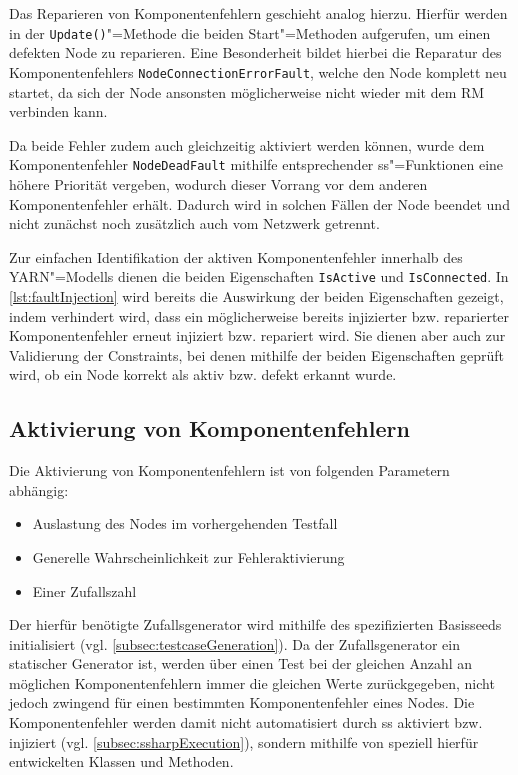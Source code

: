 Das Reparieren von Komponentenfehlern geschieht analog hierzu.
Hierfür werden in der \texttt{Update()}"=Methode die beiden Start"=Methoden aufgerufen, um einen defekten Node zu reparieren.
Eine Besonderheit bildet hierbei die Reparatur des Komponentenfehlers \texttt{NodeConnectionErrorFault}, welche den Node komplett neu startet, da sich der Node ansonsten möglicherweise nicht wieder mit dem \gls{RM} verbinden kann.

Da beide Fehler zudem auch gleichzeitig aktiviert werden können, wurde dem Komponentenfehler \texttt{NodeDeadFault} mithilfe entsprechender \gls{ss}"=Funktionen eine höhere Priorität vergeben, wodurch dieser Vorrang vor dem anderen Komponentenfehler erhält.
Dadurch wird in solchen Fällen der Node beendet und nicht zunächst noch zusätzlich auch vom Netzwerk getrennt.

Zur einfachen Identifikation der aktiven Komponentenfehler innerhalb des YARN"=Modells dienen die beiden Eigenschaften \texttt{IsActive} und \texttt{IsConnected}.
In \cref{lst:faultInjection} wird bereits die Auswirkung der beiden Eigenschaften gezeigt, indem verhindert wird, dass ein möglicherweise bereits injizierter bzw. reparierter Komponentenfehler erneut injiziert bzw. repariert wird.
Sie dienen aber auch zur Validierung der Constraints, bei denen mithilfe der beiden Eigenschaften geprüft wird, ob ein Node korrekt als aktiv bzw. defekt erkannt wurde.

\subsection{Aktivierung von Komponentenfehlern}
\label{subsec:faultActivation}

Die Aktivierung von Komponentenfehlern ist von folgenden Parametern abhängig:

\begin{itemize}
    \item Auslastung des Nodes im vorhergehenden Testfall
    \item Generelle Wahrscheinlichkeit zur Fehleraktivierung
    \item Einer Zufallszahl
\end{itemize}

Der hierfür benötigte Zufallsgenerator wird mithilfe des spezifizierten Basisseeds initialisiert (vgl. \cref{subsec:testcaseGeneration}).
Da der Zufallsgenerator ein statischer Generator ist, werden über einen Test bei der gleichen Anzahl an möglichen Komponentenfehlern immer die gleichen Werte zurückgegeben, nicht jedoch zwingend für einen bestimmten Komponentenfehler eines Nodes.
Die Komponentenfehler werden damit nicht automatisiert durch \gls{ss} aktiviert bzw. injiziert (vgl. \cref{subsec:ssharpExecution}), sondern mithilfe von speziell hierfür entwickelten Klassen und Methoden.

